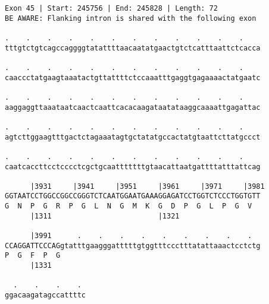 \documentclass{article}
\begin{document}
\newpage
\begin{Verbatim}[fontfamily=courier]
Exon 45 | Start: 245756 | End: 245828 | Length: 72
BE AWARE: Flanking intron is shared with the following exon

.    .    .    .    .    .    .    .    .    .    .    .    
tttgtctgtcagccaggggtatattttaacaatatgaactgtctcatttaattctcacca

.    .    .    .    .    .    .    .    .    .    .    .    
caaccctatgaagtaaatactgttattttctccaaatttgaggtgagaaaactatgaatc

.    .    .    .    .    .    .    .    .    .    .    .    
aaggaggttaaataatcaactcaattcacacaagataatataaggcaaaattgagattac

.    .    .    .    .    .    .    .    .    .    .    .    
agtcttggaagtttgactctagaaatagtgctatatgccactatgtaattcttatgccct

.    .    .    .    .    .    .    .    .    .    .    .    
caatcaccttcctcccctcgctgcaatttttttgtaacattaatgattttatttattcag

      |3931     |3941     |3951     |3961     |3971     |3981
GGTAATCCTGGCCGGCCGGGTCTCAATGGAATGAAAGGAGATCCTGGTCTCCCTGGTGTT
G  N  P  G  R  P  G  L  N  G  M  K  G  D  P  G  L  P  G  V  
      |1311                         |1321                   

      |3991      .    .    .    .    .    .    .    .    .  
CCAGGATTCCCAGgtatttgaagggatttttgtggtttccctttatattaaactcctctg
P  G  F  P  G                                               
      |1331                                                 

  .    .    .    . 
ggacaagatagccattttc
\end{Verbatim}
\newpage
\end{document}
